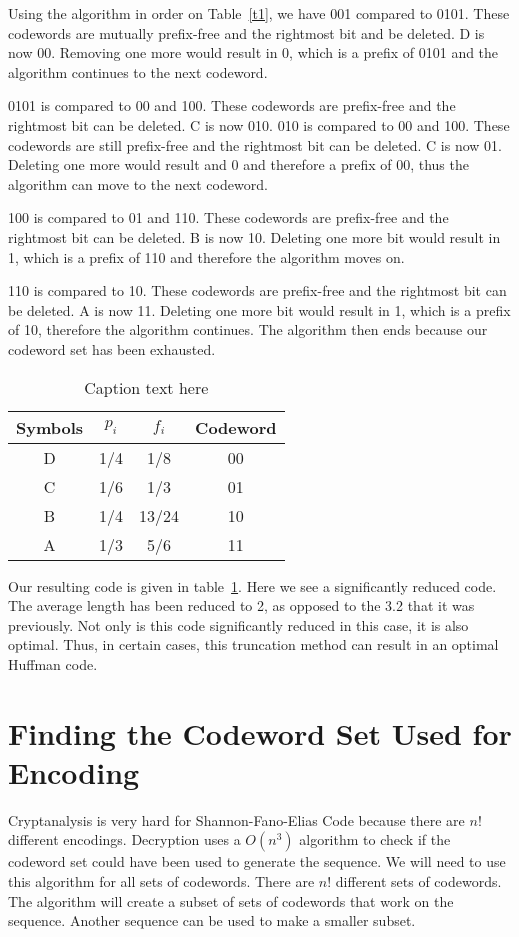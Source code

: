 \documentclass[10pt,letterpaper,notitlepage,draft]{article}
\theoremstyle{definition}
\begin{document}
Using the algorithm in order on Table~\ref{t1}, we have 
001 compared to 0101.  
These codewords are mutually prefix-free and the rightmost bit and be deleted.  
D is now 00.  
Removing one more would result in 0, which is a prefix of 0101 and the algorithm continues to the next codeword.

0101 is compared to 00 and 100.
These codewords are prefix-free and the rightmost bit can be deleted.
C is now 010.
010 is compared to 00 and 100.
These codewords are still prefix-free and the rightmost bit can be deleted.
C is now 01.
Deleting one more would result and 0 and therefore a prefix of 00, thus the algorithm can move to the next codeword.

100 is compared to 01 and 110.
These codewords are prefix-free and the rightmost bit can be deleted.
B is now 10.
Deleting one more bit would result in 1, which is a prefix of 110 and therefore the algorithm moves on.

110 is compared to 10.
These codewords are prefix-free and the rightmost bit can be deleted.
A is now 11.
Deleting one more bit would result in 1, which is a prefix of 10, therefore the algorithm continues.
The algorithm then ends because our codeword set has been exhausted.

\begin{table}[h]
\begin{center}
\begin{tabular}{|c|c|c|c|}
\hline
Symbols & $p_i$ & $f_i$ & Codeword \\
\hline
\hline
D & 1/4 & 1/8 & 00 \\
\hline
C & 1/6 & 1/3 & 01 \\
\hline
B & 1/4 & 13/24 & 10 \\
\hline
A & 1/3 & 5/6 & 11 \\
\hline
\end{tabular}
\end{center}
\caption{Caption text here}\label{t3}
\end{table}

Our resulting code is given in table~\ref{t3}.
Here we see a significantly reduced code.  The average length has been reduced to 2, as opposed to the 3.2 that it was previously.  Not only is this code significantly reduced in this case, it is also optimal.  Thus, in certain cases, this truncation method can result in an optimal Huffman code.


\section{Finding the Codeword Set Used for Encoding}
Cryptanalysis is very hard for Shannon-Fano-Elias Code because there are $n!$ different encodings. 
Decryption uses a $O(n^3)$ algorithm to check if the codeword set could have been used to generate the sequence. 
We will need to use this algorithm for all sets of codewords. There are $n!$ different sets of codewords. 
The algorithm will create a subset of sets of codewords that work on the sequence.
Another sequence can be used to make a smaller subset.
\end{document}
